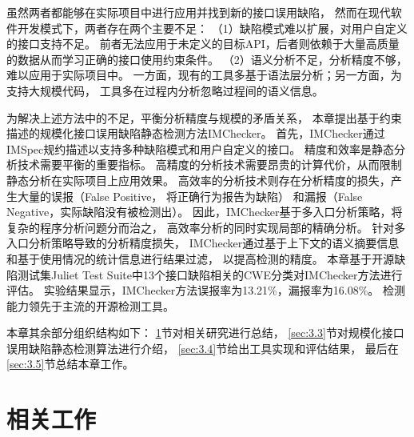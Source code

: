 虽然两者都能够在实际项目中进行应用并找到新的接口误用缺陷，
然而在现代软件开发模式下，两者存在两个主要不足：
（1）缺陷模式难以扩展，对用户自定义的接口支持不足。
前者无法应用于未定义的目标API，后者则依赖于大量高质量的数据从而学习正确的接口使用约束条件。
（2）语义分析不足，分析精度不够，难以应用于实际项目中。
一方面，现有的工具多基于语法层分析；另一方面，为支持大规模代码，
工具多在过程内分析忽略过程间的语义信息。


为解决上述方法中的不足，平衡分析精度与规模的矛盾关系，
本章提出基于约束描述的规模化接口误用缺陷静态检测方法IMChecker。
首先，IMChecker通过IMSpec规约描述以支持多种缺陷模式和用户自定义的接口。
精度和效率是静态分析技术需要平衡的重要指标。
高精度的分析技术需要昂贵的计算代价，从而限制静态分析在实际项目上应用效果。
高效率的分析技术则存在分析精度的损失，产生大量的误报（False Positive， 将正确行为报告为缺陷）
和漏报（False Negative，实际缺陷没有被检测出）。
因此，IMChecker基于多入口分析策略，将复杂的程序分析问题分而治之，
高效率分析的同时实现局部的精确分析。
针对多入口分析策略导致的分析精度损失，
IMChecker通过基于上下文的语义摘要信息和基于使用情况的统计信息进行结果过滤，
以提高检测的精度。
本章基于开源缺陷测试集Juliet Test Suite中13个接口缺陷相关的CWE分类对IMChecker方法进行评估。
实验结果显示，IMChecker方法误报率为13.21\%，漏报率为16.08\%。
检测能力领先于主流的开源检测工具。

本章其余部分组织结构如下：
\ref{sec:3.2}节对相关研究进行总结，
\ref{sec:3.3}节对规模化接口误用缺陷静态检测算法进行介绍，
\ref{sec:3.4}节给出工具实现和评估结果，
最后在\ref{sec:3.5}节总结本章工作。
\section{相关工作}
\label{sec:3.2}

